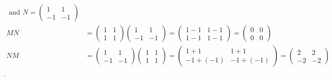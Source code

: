 \documentclass[11pt]{amsart}
\theoremstyle{definition}  %
\begin{document}
\begin{align*}
	\text{ and } 	N = \left ( \begin{array}{cc}
		1 & 1\\
		-1 & -1
\end{array}	 \right ) \\
	MN &= \left ( \begin{array}{cc}
		1 & 1\\
		1 & 1
\end{array}	 \right ) 
 \left ( \begin{array}{cc}
		1 & 1\\
		-1 & -1
\end{array}	 \right ) =
\left ( \begin{array}{cc}
	1-1 & 1-1 \\
	1-1 & 1-1
\end{array} \right ) =
\left ( \begin{array}{cc}
	0 & 0 \\
	0 & 0
\end{array} \right ) \\
	NM &=  \left ( \begin{array}{cc}
		1 & 1\\
		-1 & -1
\end{array}	 \right )\left ( \begin{array}{cc}
		1 & 1\\
		1 & 1
\end{array}	 \right )  =
\left ( \begin{array}{cc}
	1+1 & 1+1 \\
	-1+(-1) & -1+(-1) 
\end{array}\right ) =
\left ( \begin{array}{cc}
	2 & 2 \\
	-2 & -2 
\end{array} \right )
\end{align*}.
\\
\end{document}
